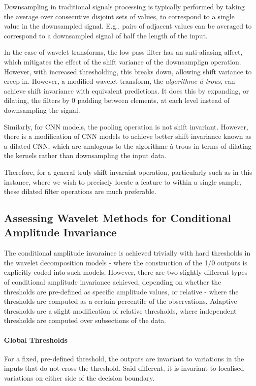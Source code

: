 \documentclass[9pt,conference]{IEEEtran}
\begin{document}
Downsampling in traditional signals processing is typically performed by taking the average over consecutive disjoint sets of values, to correspond to a single value in the downsampled signal. E.g., pairs of adjacent values can be averaged to correspond to a downsampled signal of half the length of the input.

In the case of wavelet transforms, the low pass filter has an anti-aliasing affect, which mitigates the effect of the shift variance of the downsamplign operation. \cite{bradley2003shift} However, with increased thresholding, this breaks down, allowing shift variance to creep in. However, a modified wavelet transform, the \textit{algorithme à trous}, can achieve shift invariance with equivalent predictions. It does this by expanding, or dilating, the filters by 0 padding between elements, at each level instead of downsampling the signal.

Similarly, for CNN models, the pooling operation is not shift invariant. However, there is a modification of CNN models to achieve better shift invariance known as a dilated CNN, which are analogous to the algorithme à trous in terms of dilating the kernels rather than downsampling the input data.

Therefore, for a general truly shift invaraint operation, particularly such as in this instance, where we wish to precisely locate a feature to within a single sample, these dilated filter operations are much preferable.

\subsection{Assessing Wavelet Methods for Conditional Amplitude Invariance}

The conditional amplitude invaraince is achieved trivially with hard thresholds in the wavelet decomposition models - where the construction of the 1/0 outputs is explicitly coded into such models. However, there are two slightly different types of conditional amplitude invariance achieved, depending on whether the thresholds are pre-defined as specific amplitude values, or relative - where the thresholds are computed as a certain percentile of the observations. Adaptive thresholds are a slight modification of relative thresholds, where independent thresholds are computed over subsections of the data.

\paragraph{Global Thresholds}
For a fixed, pre-defined threshold, the outputs are invariant to variations in the inputs that do not cross the threshold. Said different, it is invariant to localised variations on either side of the decision boundary.
\end{document}
